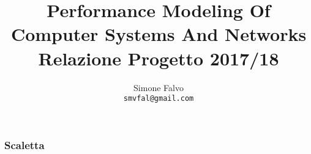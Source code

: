 \documentclass{beamer}
\title{
  Performance Modeling Of Computer Systems And Networks\\[20pt]
  Relazione Progetto 2017/18
}
\author{
  Simone Falvo\\
  \texttt{smvfal@gmail.com}
}
\date{}
\begin{document}
\maketitle

\begin{frame}
\frametitle{Scaletta}
\tableofcontents
\end{frame}







\end{document}
